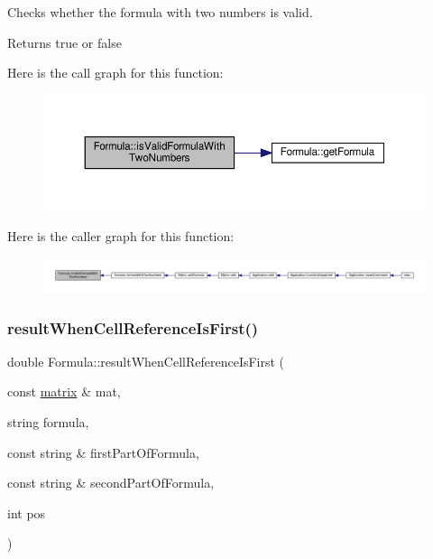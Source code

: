 Checks whether the formula with two numbers is valid. \begin{DoxyReturn}{Returns}
true or false 
\end{DoxyReturn}
Here is the call graph for this function\+:
\nopagebreak
\begin{figure}[H]
\begin{center}
\leavevmode
\includegraphics[width=350pt]{class_formula_a0a2b13b0f741ea650e1ae71269dde9a5_cgraph}
\end{center}
\end{figure}
Here is the caller graph for this function\+:
\nopagebreak
\begin{figure}[H]
\begin{center}
\leavevmode
\includegraphics[width=350pt]{class_formula_a0a2b13b0f741ea650e1ae71269dde9a5_icgraph}
\end{center}
\end{figure}
\mbox{\label{class_formula_a9a27ccdd3ee3143b1f6e541ec3c6a0ec}} 
\subsubsection{\texorpdfstring{result\+When\+Cell\+Reference\+Is\+First()}{resultWhenCellReferenceIsFirst()}}
{\footnotesize\ttfamily double Formula\+::result\+When\+Cell\+Reference\+Is\+First (\begin{DoxyParamCaption}\item[{const \hyperlink{formula_8h_a869e2a5deeb3daa4c82d6bc91cf20d92}{matrix} \&}]{mat,  }\item[{string}]{formula,  }\item[{const string \&}]{first\+Part\+Of\+Formula,  }\item[{const string \&}]{second\+Part\+Of\+Formula,  }\item[{int}]{pos }\end{DoxyParamCaption})\hspace{0.3cm}{\ttfamily [private]}}

